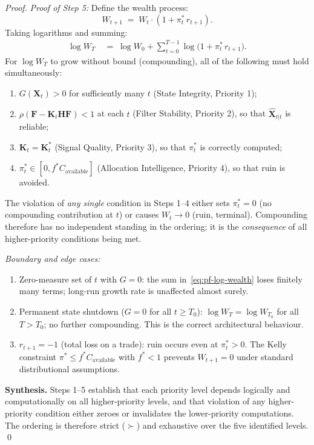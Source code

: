 \documentclass[12pt,openany]{book}
\numberwithin{equation}{chapter}
\theoremstyle{plain}
\theoremstyle{definition}
\theoremstyle{remark}
\begin{document}
\begin{proof}
\noindent\textit{Proof of Step 5:}
Define the wealth process:
\begin{equation}
  W_{t+1} \;=\; W_t \cdot (1 + \pi^*_t\, r_{t+1}).
  \label{eq:pf-wealth-process}
\end{equation}
Taking logarithms and summing:
\begin{align}
  \log W_T
  &\;=\; \log W_0
        + \sum_{t=0}^{T-1} \log\!\bigl(1 + \pi^*_t\, r_{t+1}\bigr).
  \label{eq:pf-log-wealth}
\end{align}
For $\log W_T$ to grow without bound (compounding), all of
the following must hold simultaneously:
\begin{enumerate}
  \item $G(\mathbf{X}_t) > 0$ for sufficiently many $t$
        (State Integrity, Priority 1);
  \item $\rho(\mathbf{F}-\mathbf{K}_t\mathbf{H}\mathbf{F}) < 1$
        at each $t$ (Filter Stability, Priority 2), so that
        $\hat{\mathbf{X}}_{t|t}$ is reliable;
  \item $\mathbf{K}_t = \mathbf{K}_t^*$ (Signal Quality, Priority 3),
        so that $\pi^*_t$ is correctly computed;
  \item $\pi^*_t \in [0, f^* C_{\mathrm{available}}]$
        (Allocation Intelligence, Priority 4), so that ruin
        is avoided.
\end{enumerate}
The violation of \emph{any single} condition in Steps 1--4
either sets $\pi^*_t = 0$ (no compounding contribution at $t$)
or causes $W_t \to 0$ (ruin, terminal).  Compounding therefore
has no independent standing in the ordering; it is the
\emph{consequence} of all higher-priority conditions being met.

\noindent\textit{Boundary and edge cases:}
\begin{enumerate}
  \item Zero-measure set of $t$ with $G=0$: the sum
        in~\eqref{eq:pf-log-wealth} loses finitely many terms;
        long-run growth rate is unaffected almost surely.
  \item Permanent state shutdown ($G=0$ for all $t \geq T_0$):
        $\log W_T = \log W_{T_0}$ for all $T > T_0$; no further
        compounding.  This is the correct architectural behaviour.
  \item $r_{t+1} = -1$ (total loss on a trade): ruin occurs even
        at $\pi^*_t > 0$.  The Kelly constraint $\pi^* \leq
        f^* C_{\mathrm{available}}$ with $f^* < 1$ prevents
        $W_{t+1} = 0$ under standard distributional assumptions.
\end{enumerate}

\medskip
\noindent\textbf{Synthesis.}
Steps 1--5 establish that each priority level depends logically
and computationally on all higher-priority levels, and that
violation of any higher-priority condition either zeroes or
invalidates the lower-priority computations.  The ordering is
therefore strict ($\succ$) and exhaustive over the five
identified levels.  \qed
\end{proof}
\end{document}

